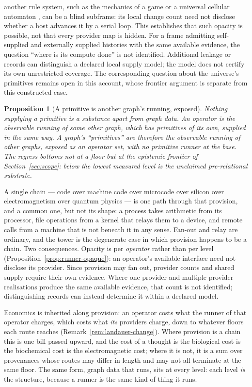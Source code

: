 \documentclass[11pt,a4paper]{article}
\newtheorem{proposition}[definition]{Proposition}
\theoremstyle{remark}\newtheorem{remark}[definition]{Remark}
\begin{document}
another rule system, such as the mechanics of a game or a universal cellular
automaton \citep{berlekamp1982}, can be a blind subframe: its local change
count need not disclose whether a host advances it by a serial loop. This
establishes that such opacity is possible, not that every provider map is
hidden. For a frame admitting self-supplied and externally supplied histories
with the same available evidence, the question ``where is its compute done''
is not identified. Additional leakage or records can distinguish a declared
local supply model; the model does not certify its own unrestricted coverage.
The corresponding question about the universe's primitives remains open in
this account, whose frontier argument is separate from this constructed case.

\begin{proposition}[A primitive is another graph's running, exposed]\label{prop:runner-recursion}
Nothing supplying a primitive is a substance apart from graph data. An operator is the observable running of some other graph, which has primitives of its own, supplied in the same way. A graph's ``primitives'' are therefore the observable running of other graphs, exposed as an operator set, with no primitive runner at the base. The regress bottoms not at a floor but at the epistemic frontier of Section~\ref{sec:scope}: below the lowest measured level is the unclaimed pre-relational substrate.
\end{proposition}
A single chain --- code over machine code over microcode over silicon over electromagnetism over quantum physics --- is one path through that provision, and a common one, but not its shape: a process takes arithmetic from its processor, file operations from a kernel that relays them to a device, and remote calls from a machine that is not beneath it in any sense. Fan-out and relay are ordinary, and the tower is the degenerate case in which provision happens to be a chain.
Two consequences. Opacity is per \emph{operator} rather than per level
(Proposition~\ref{prop:runner-opaque}): an operator's available interface need
not disclose its provider. Since provision may fan out, provider counts and
shared supply require their own evidence. Where one-provider and multiple-provider
realisations produce the same available evidence, that count is not identified;
distinguishing records can instead determine it within a declared model.

Economics is inherited along provision: an operator costs what the runner
of that operator charges, which costs what \emph{its} providers charge, down
to whatever floors each route reaches (Remark~\ref{rem:landauer-change}).
Where provision is a chain this is one bill passed upward, and the cost of a
thought is the biological cost is the biochemical cost is the electromagnetic
cost; where it is not, it is a sum over provenances whose routes may differ in
length and may not all terminate at the same floor. The same form, graph data
that runs, sits at every level: each level \emph{is} the structure, because a
runner is the same kind of thing it runs.
\end{document}
